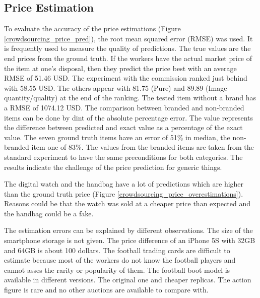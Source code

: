 \subsection{Price Estimation}
To evaluate the accuracy of the price estimations (Figure \ref{crowdsourcing_price_pred}), the root mean squared error (RMSE) was used. It is frequently used to measure the quality of predictions. The true values are the end prices from the ground truth. If the workers have the actual market price of the item at one's disposal, then they predict the price best with an average RMSE of 51.46 USD. The experiment with the commission ranked just behind with 58.55 USD. The others appear with 81.75 (Pure) and 89.89 (Image quantity/quality) at the end of the ranking. The tested item without a brand has a RMSE of 1074.12 USD. The comparison between branded and non-branded items can be done by dint of the absolute percentage error. The value represents the difference between predicted and exact value as a percentage of the exact value. The seven ground truth items have an error of 51\% in median, the non-branded item one of 83\%. The values from the branded items are taken from the standard experiment to have the same preconditions for both categories. The results indicate the challenge of the price prediction for generic things.

The digital watch and the handbag have a lot of predictions which are higher than the ground truth price (Figure \ref{crowdsourcing_price_overestimations}). Reasons could be that the watch was sold at a cheaper price than expected and the handbag could be a fake.

The estimation errors can be explained by different observations. The size of the smartphone storage is not given. The price difference of an iPhone 5S with 32GB and 64GB is about 100 dollars. The football trading cards are difficult to estimate because most of the workers do not know the football players and cannot asses the rarity or popularity of them. The football boot model is available in different versions. The original one and cheaper replicas. The action figure is rare and no other auctions are available to compare with.

